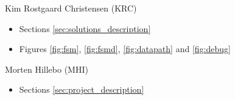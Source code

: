 Kim Rostgaard Christensen (KRC)
\begin{itemize}
\item Sections \ref{sec:solutions_description}
\item Figures \ref{fig:fsm}, \ref{fig:fsmd}, \ref{fig:datapath} and \ref{fig:debug}
\end{itemize}

Morten Hillebo (MHI) 
\begin{itemize}
\item Sections \ref{sec:project_description}
\end{itemize}
